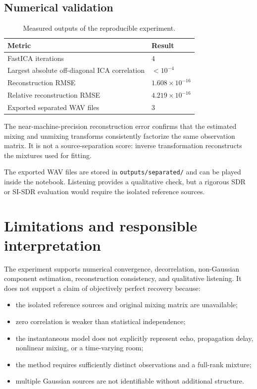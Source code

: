 \documentclass[
    paper=a4,
    fontsize=11pt,
    DIV=11,
    parskip=half,
    headings=normal,
    numbers=noendperiod,
    abstract=true,
    titlepage=true
]{scrartcl}
\begin{document}
\subsection{Numerical validation}

\begin{table}[htbp]
    \centering
    \caption{Measured outputs of the reproducible experiment.}
    \label{tab:results}
    \begin{tabular}{ll}
        \toprule
        Metric & Result \\
        \midrule
        FastICA iterations & 4 \\
        Largest absolute off-diagonal ICA correlation & $<10^{-4}$ \\
        Reconstruction RMSE & $1.608\times10^{-16}$ \\
        Relative reconstruction RMSE & $4.219\times10^{-16}$ \\
        Exported separated WAV files & 3 \\
        \bottomrule
    \end{tabular}
\end{table}

The near-machine-precision reconstruction error confirms that the estimated mixing and unmixing transforms consistently factorize the same observation matrix. It is not a source-separation score: inverse transformation reconstructs the mixtures used for fitting.

The exported WAV files are stored in \texttt{outputs/separated/} and can be played inside the notebook. Listening provides a qualitative check, but a rigorous SDR or SI-SDR evaluation would require the isolated reference sources.

\section{Limitations and responsible interpretation}

The experiment supports numerical convergence, decorrelation, non-Gaussian component estimation, reconstruction consistency, and qualitative listening. It does not support a claim of objectively perfect recovery because:
\begin{itemize}
    \item the isolated reference sources and original mixing matrix are unavailable;
    \item zero correlation is weaker than statistical independence;
    \item the instantaneous model does not explicitly represent echo, propagation delay, nonlinear mixing, or a time-varying room;
    \item the method requires sufficiently distinct observations and a full-rank mixture;
    \item multiple Gaussian sources are not identifiable without additional structure.
\end{itemize}
\end{document}
